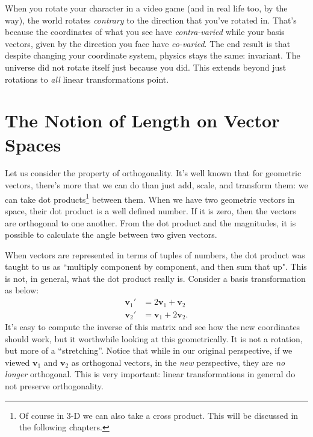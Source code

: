 \documentclass[../master.tex]{subfiles}
\begin{document}
	
	 When you rotate your character in a video game (and in real life too, by the way), the world rotates \emph{contrary} to the direction that you've rotated in. That's because the coordinates of what you see have \emph{contra-varied} while your basis vectors, given by the direction you face have \emph{co-varied}. The end result is that despite changing your coordinate system, physics stays the same: invariant. The universe did not rotate itself just because you did. This extends beyond just rotations to \emph{all} linear transformations point. \\
	
	
	\section{The Notion of Length on Vector Spaces} %
	\label{sec:the_notion_of_length_on_vector_spaces}
	
	Let us consider the property of orthogonality. It's well known that for geometric vectors, there's more that we can do than just add, scale, and transform them: we can take dot products\footnote{Of course in 3-D we can also take a cross product. This will be discussed in the following chapters.} between them. When we have two geometric vectors in space, their dot product is a well defined number. If it is zero, then the vectors are orthogonal to one another. From the dot product and the magnitudes, it is possible to calculate the angle between two given vectors. 
	
	When vectors are represented in terms of tuples of numbers, the dot product was taught to us as ``multiply component by component, and then sum that up". This is not, in general, what the dot product really is. Consider a basis transformation as below:
	\begin{align*}
		\mathbf v_1' &= 2 \mathbf v_1 + \mathbf v_2 \\
		\mathbf v_2' &=  \mathbf v_1 + 2 \mathbf v_2.
	\end{align*}
	It's easy to compute the inverse of this matrix and see how the new coordinates should work, but it worthwhile looking at this geometrically. It is not a rotation, but more of a ``stretching''. Notice that while in our original perspective, if we viewed $\mathbf v_1$ and $\mathbf v_2$ as orthogonal vectors, in the \emph{new} perspective, they are \emph{no longer} orthogonal. This is very important: linear transformations in general do not preserve orthogonality.
	
\end{document}
